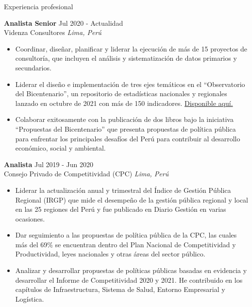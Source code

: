 \documentclass{resume} %
\begin{document}
\begin{rSection}{Experiencia profesional}

\textbf{Analista Senior} \hfill Jul 2020 - Actualidad\\
Videnza Consultores \hfill \textit{Lima, Perú}
 \begin{itemize}
    \itemsep -3pt {} 
     \item Coordinar, diseñar, planificar y liderar la ejecución de más de 15 proyectos de consultoría, que incluyen el análisis y sistematización de datos primarios y secundarios.
     \item Liderar el diseño e implementación de tres ejes temáticos en el “Observatorio del Bicentenario”, un repositorio de estadísticas nacionales y regionales lanzado en octubre de 2021 con más de 150 indicadores. \href{https://propuestasdelbicentenario.pe/observatorio/}{Disponible aquí.}
    \item Colaborar exitosamente con la publicación de dos libros bajo la iniciativa “Propuestas del Bicentenario” que presenta propuestas de política pública para enfrentar los principales desafíos del Perú para contribuir al desarrollo económico, social y ambiental. 
 \end{itemize}
 
 \textbf{Analista} \hfill Jul 2019 - Jun 2020\\
Consejo Privado de Competitividad (CPC) \hfill \textit{Lima, Perú}
 \begin{itemize}
    \itemsep -3pt {} 
     \item Liderar la actualización anual y trimestral del Índice de Gestión Pública Regional (IRGP) que mide el desempeño de la gestión pública regional y local en las 25 regiones del Perú y fue publicado en Diario Gestión en varias ocasiones.
     \item Dar seguimiento a las propuestas de política pública de la CPC, las cuales más del 69\% se encuentran dentro del Plan Nacional de Competitividad y Productividad, leyes nacionales y otras áreas del sector público.
    \item Analizar y desarrollar propuestas de políticas públicas basadas en evidencia y desarrollar el Informe de Competitividad 2020 y 2021. He contribuido en los capítulos de Infraestructura, Sistema de Salud, Entorno Empresarial y Logística.
 \end{itemize}


 
\end{rSection} 
\end{document}
